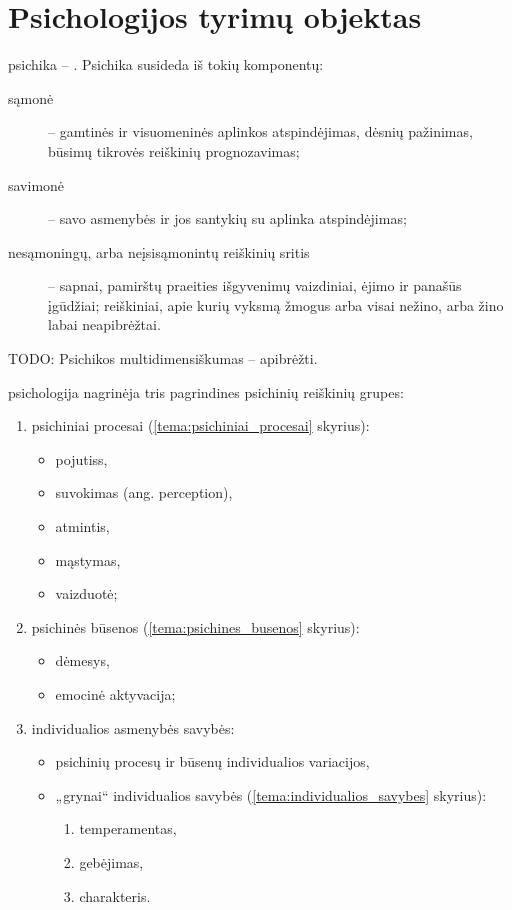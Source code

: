 \section{Psichologijos tyrimų objektas}

\label{tema:psichikos_samprata}

\Gls{psichika} – . Psichika susideda iš tokių 
komponentų:
\begin{description}
  \item[sąmonė] – gamtinės ir visuomeninės aplinkos atspindėjimas, dėsnių
    pažinimas, būsimų tikrovės reiškinių prognozavimas;
  \item[savimonė] – savo asmenybės ir jos santykių su aplinka atspindėjimas;
  \item[nesąmoningų, arba neįsisąmonintų reiškinių sritis] – sapnai, 
    pamirštų praeities išgyvenimų vaizdiniai, ėjimo ir panašūs įgūdžiai;
    reiškiniai, apie kurių vyksmą žmogus arba visai nežino, arba žino
    labai neapibrėžtai.
\end{description}

TODO: Psichikos multidimensiškumas – apibrėžti.

\Gls{psichologija} nagrinėja tris pagrindines psichinių reiškinių grupes:
\begin{enumerate}
  \item psichiniai procesai (\ref{tema:psichiniai_procesai} skyrius):
    \begin{itemize}
      \item \glspl{pojutis},
      \item suvokimas (ang. perception),
      \item atmintis,
      \item mąstymas,
      \item vaizduotė;
    \end{itemize}
  \item psichinės būsenos (\ref{tema:psichines_busenos} skyrius):
    \begin{itemize}
      \item dėmesys,
      \item emocinė aktyvacija;
    \end{itemize}
  \item individualios asmenybės savybės:
    \begin{itemize}
      \item psichinių procesų ir būsenų individualios variacijos,
      \item „grynai“ individualios savybės
        (\ref{tema:individualios_savybes} skyrius):
        \begin{enumerate}
          \item temperamentas,
          \item gebėjimas,
          \item charakteris.
        \end{enumerate}
    \end{itemize}
\end{enumerate}

